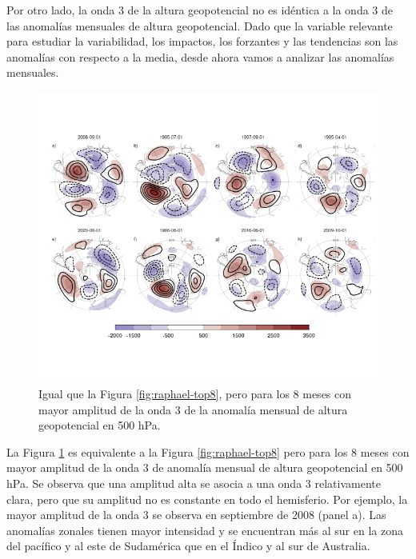 \documentclass[12pt,oneside]{reedthesis}
\begin{document}
Por otro lado, la onda 3 de la altura geopotencial no es idéntica a la onda 3 de las anomalías mensuales de altura geopotencial.
Dado que la variable relevante para estudiar la variabilidad, los impactos, los forzantes y las tendencias son las anomalías con respecto a la media, desde ahora vamos a analizar las anomalías mensuales.

\begin{figure}
\includegraphics{figures/15-onda3/zw3-top8-1} \caption{Igual que la Figura \ref{fig:raphael-top8}, pero para los 8 meses con mayor amplitud de la onda 3 de la anomalía mensual de altura geopotencial en 500 hPa.}\label{fig:zw3-top8}
\end{figure}



La Figura \ref{fig:zw3-top8} es equivalente a la Figura \ref{fig:raphael-top8} pero para los 8 meses con mayor amplitud de la onda 3 de anomalía mensual de altura geopotencial en 500 hPa.
Se observa que una amplitud alta se asocia a una onda 3 relativamente clara, pero que su amplitud no es constante en todo el hemisferio.
Por ejemplo, la mayor amplitud de la onda 3 se observa en septiembre de 2008 (panel a).
Las anomalías zonales tienen mayor intensidad y se encuentran más al sur en la zona del pacífico y al este de Sudamérica que en el Índico y al sur de Australia.
\end{document}
